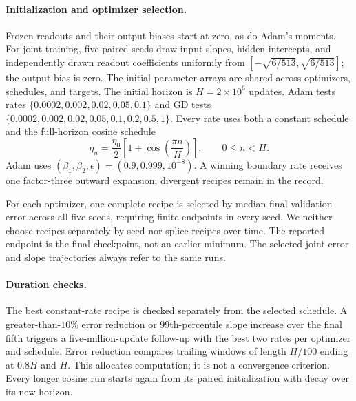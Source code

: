 \paragraph{Initialization and optimizer selection.}
Frozen readouts and their output biases start at zero, as do Adam's moments.
For joint training, five paired seeds draw input slopes, hidden intercepts,
and independently drawn readout coefficients uniformly from
$[-\sqrt{6/513},\sqrt{6/513}]$; the output bias is zero.
The initial parameter arrays are shared across optimizers, schedules, and
targets. The initial horizon is $H=2\times10^6$ updates.
Adam tests rates $\{0.0002,0.002,0.02,0.05,0.1\}$ and GD tests
$\{0.0002,0.002,0.02,0.05,0.1,0.2,0.5,1\}$.
Every rate uses both a constant schedule and the full-horizon cosine schedule
\begin{equation}
 \eta_n=\frac{\eta_0}{2}\left[1+\cos\left(\frac{\pi n}{H}\right)\right],
 \qquad 0\leq n<H.
\end{equation}
Adam uses $(\beta_1,\beta_2,\epsilon)=(0.9,0.999,10^{-8})$.
A winning boundary rate receives one factor-three outward expansion;
divergent recipes remain in the record.

For each optimizer, one complete recipe is selected by median final
validation error across all five seeds, requiring finite endpoints in every
seed. We neither choose recipes separately by seed nor splice recipes over
time. The reported endpoint is the final checkpoint, not an earlier minimum.
The selected joint-error and slope trajectories always refer to the same runs.

\paragraph{Duration checks.}
The best constant-rate recipe is checked separately from the selected
schedule. A greater-than-$10\%$ error reduction or $99$th-percentile slope
increase over the final fifth triggers a five-million-update follow-up with
the best two rates per optimizer and schedule. Error reduction compares
trailing windows of length $H/100$ ending at $0.8H$ and $H$. This allocates
computation; it is not a convergence criterion. Every longer cosine run
starts again from its paired initialization with decay over its new horizon.

